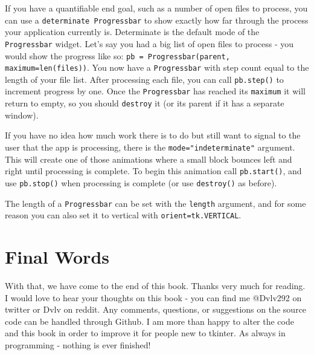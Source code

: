 \documentclass[a4paper,11pt,openany]{book}
\begin{document}
If you have a quantifiable end goal, such as a number of open files to process, you can use a \lstinline[columns=fixed]{determinate Progressbar} to show exactly how far through the process your application currently is. Determinate is the default mode of the \lstinline[columns=fixed]{Progressbar} widget. Let's say you had a big list of open files to process - you would show the progress like so: \lstinline[columns=fixed]{pb = Progressbar(parent, maximum=len(files))}. You now have a \lstinline[columns=fixed]{Progressbar} with step count equal to the length of your file list. After processing each file, you can call \lstinline[columns=fixed]{pb.step()} to increment progress by one. Once the \lstinline[columns=fixed]{Progressbar} has reached its \lstinline[columns=fixed]{maximum} it will return to empty, so you should \lstinline[columns=fixed]{destroy} it (or its parent if it has a separate window).

\vspace{5mm}

If you have no idea how much work there is to do but still want to signal to the user that the app is processing, there is the \lstinline[columns=fixed]{mode="indeterminate"} argument. This will create one of those animations where a small block bounces left and right until processing is complete. To begin this animation call \lstinline[columns=fixed]{pb.start()}, and use \lstinline[columns=fixed]{pb.stop()} when processing is complete (or use \lstinline[columns=fixed]{destroy()} as before). 

\vspace{5mm}

The length of a \lstinline[columns=fixed]{Progressbar} can be set with the \lstinline[columns=fixed]{length} argument, and for some reason you can also set it to vertical with \lstinline[columns=fixed]{orient=tk.VERTICAL}.

\section{Final Words}

With that, we have come to the end of this book. Thanks very much for reading. I would love to hear your thoughts on this book - you can find me @Dvlv292 on twitter or Dvlv on reddit. Any comments, questions, or suggestions on the source code can be handled through Github. I am more than happy to alter the code and this book in order to improve it for people new to tkinter. As always in programming - nothing is ever finished! 
\end{document}
